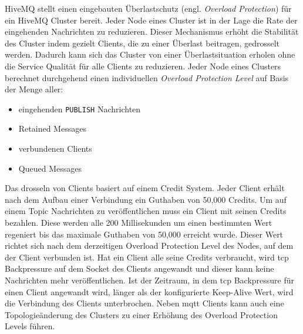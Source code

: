  \label{sb:overload-protection}
HiveMQ stellt einen eingebauten Überlastschutz (engl. \textit{Overload Protection}) für ein HiveMQ Cluster bereit. Jeder Node eines Cluster ist in der Lage die Rate der eingehenden Nachrichten zu reduzieren. Dieser Mechanismus erhöht die Stabilität des Cluster indem gezielt Clients, die zu einer Überlast beitragen, gedrosselt werden. Dadurch kann sich das Cluster von einer Überlastsituation erholen ohne die Service Qualität für alle Clients zu reduzieren.
Jeder Node eines Clusters berechnet durchgehend einen individuellen \textit{Overload Protection Level} auf Basis der Menge aller:
\begin{itemize}
    \item eingehenden \verb|PUBLISH| Nachrichten
    \item Retained Messages
    \item verbundenen Clients
    \item Queued Messages
\end{itemize}
Das drosseln von Clients basiert auf einem Credit System. Jeder Client erhält nach dem Aufbau einer Verbindung ein Guthaben von 50,000 Credits. Um auf einem Topic Nachrichten zu veröffentlichen muss ein Client mit seinen Credits bezahlen. Diese werden alle 200 Millisekunden um einen bestimmten Wert regeniert bis das maximale Guthaben von 50,000 erreicht wurde. Dieser Wert richtet sich nach dem derzeitigen Overload Protection Level des Nodes, auf dem der Client verbunden ist.
Hat ein Client alle seine Credits verbraucht, wird \ac{tcp} Backpressure auf dem Socket des Clients angewandt und dieser kann keine Nachrichten mehr veröffentlichen.
Ist der Zeitraum, in dem \ac{tcp} Backpressure für einen Client angewandt wird, länger als der konfigurierte Keep-Alive Wert, wird die Verbindung des Clients unterbrochen.
Neben \ac{mqtt} Clients kann auch eine Topologieänderung des Clusters zu einer Erhöhung des Overload Protection Levels führen.
\cite{ClusterOverloadProtection}


